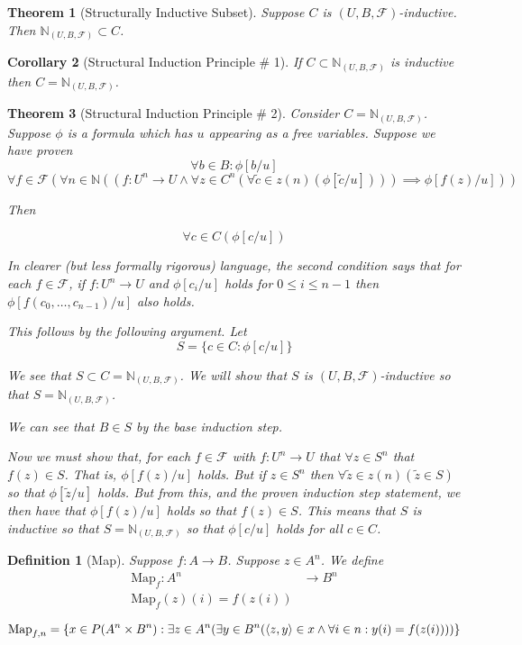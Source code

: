 \documentclass[12pt]{article}
\theoremstyle{break}
\newtheorem{definition}{Definition}[section]
\theoremstyle{break}
\newtheorem{theorem}{Theorem}[section]
\theoremstyle{break}
\newtheorem{corollary}[theorem]{Corollary}
\theoremstyle{break}
\theoremstyle{break}
\newtheorem{informal definition}[definition]{Informal Definition}
\begin{document}
\begin{theorem}[Structurally Inductive Subset]
Suppose $C$ is $(U, B, \mathcal{F})$-inductive.
Then $\mathbb{N}_{(U, B, \mathcal{F})} \subset C$.
\end{theorem}

\begin{corollary}[Structural Induction Principle \# 1]
If $C\subset\mathbb{N}_{(U, B, \mathcal{F})}$ is inductive then $C = \mathbb{N}_{(U, B, \mathcal{F})}$.
\end{corollary}

\begin{theorem}[Structural Induction Principle \# 2]
Consider $C = \mathbb{N}_{(U, B, \mathcal{F})}$.
Suppose $\phi$ is a formula which has $u$ appearing as a free variables.
Suppose we have proven
$$
\forall b \in B: \phi[b/u]
$$
$$
\forall f \in \mathcal{F}(\forall n \in \mathbb{N}((f:U^n \to U \land \forall z \in C^n(\forall \tilde{c} \in z(n)(\phi[\tilde{c}/u])))\implies \phi[f(z)/u]))
$$

Then

$$
\forall c \in C (\phi[c/u])
$$

In clearer (but less formally rigorous) language, the second condition says that for each $f\in \mathcal{F}$, if $f:U^n \to U$ and $\phi[c_i/u]$ holds for $0\le i \le n-1$ then $\phi[f(c_0, \ldots, c_{n-1})/u]$ also holds.

This follows by the following argument.
Let
$$
S = \{c \in C: \phi[c/u]\}
$$

We see that $S \subset C = \mathbb{N}_{(U, B, \mathcal{F})}$.
We will show that $S$ is $(U, B, \mathcal{F})$-inductive so that $S = \mathbb{N}_{(U, B, \mathcal{F})}$.

We can see that $B\in S$ by the base induction step.

Now we must show that, for each $f\in \mathcal{F}$ with $f:U^n \to U$ that $\forall z \in S^n$ that $f(z)\in S$.
That is, $\phi[f(z)/u]$ holds.
But if $z\in S^n$ then $\forall \tilde{z} \in z(n) (\tilde{z}\in S)$ so that $\phi[\tilde{z}/u]$ holds.
But from this, and the proven induction step statement, we then have that $\phi[f(z)/u]$ holds so that $f(z) \in S$.
This means that $S$ is inductive so that $S = \mathbb{N}_{(U, B, \mathcal{F})}$ so that $\phi[c/u]$ holds for all $c \in C$.

\end{theorem}

\begin{definition}[Map]
Suppose $f:A \to B$.
Suppose $z \in A^n$.
We define
\begin{align*}
\text{Map}_f: A^n &\to B^n\\
\text{Map}_f(z)(i) = f(z(i))
\end{align*}

$$
\text{Map}_{f, n} = \{x \in P(A^n \times B^n): \exists z \in A^n (\exists y \in B^n (\braket{z, y} \in x \land \forall i \in n: y(i) = f(z(i))))\}
$$



\end{definition}
\end{document}
